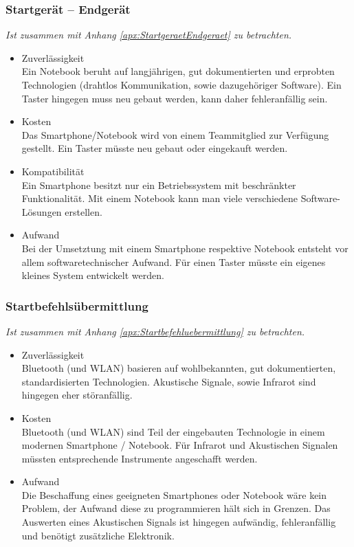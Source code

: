 		\subsubsection{Startgerät – Endgerät}
			\textit{Ist zusammen mit Anhang \ref{apx:StartgeraetEndgeraet} zu betrachten.}
			\begin{itemize}
				\item Zuverlässigkeit\\
				Ein Notebook beruht auf langjährigen, gut dokumentierten und erprobten Technologien (drahtlos Kommunikation, sowie dazugehöriger Software). Ein Taster hingegen muss neu gebaut werden, kann daher fehleranfällig sein.
				\item Kosten\\
				Das Smartphone/Notebook wird von einem Teammitglied zur Verfügung gestellt. Ein Taster müsste neu gebaut oder eingekauft werden.
				\item Kompatibilität\\
				Ein Smartphone besitzt nur ein Betriebssystem mit beschränkter Funktionalität. Mit einem Notebook kann man viele verschiedene Software-Lösungen erstellen.
				\item Aufwand\\
				Bei der Umsetztung mit einem Smartphone respektive Notebook entsteht vor allem softwaretechnischer Aufwand. Für einen Taster müsste ein eigenes kleines System entwickelt werden.
			\end{itemize}
			
		\subsubsection{Startbefehlsübermittlung}
			\textit{Ist zusammen mit Anhang \ref{apx:Startbefehluebermittlung} zu betrachten.}
			\begin{itemize}
				\item Zuverlässigkeit\\
				Bluetooth (und WLAN) basieren auf wohlbekannten, gut dokumentierten, standardisierten Technologien. Akustische Signale, sowie Infrarot sind hingegen eher störanfällig.
				\item Kosten\\
				Bluetooth (und WLAN) sind Teil der eingebauten Technologie in einem modernen Smartphone / Notebook. Für Infrarot und Akustischen Signalen müssten entsprechende Instrumente angeschafft werden.
				\item Aufwand\\
				Die Beschaffung eines geeigneten Smartphones oder Notebook wäre kein Problem, der Aufwand diese zu programmieren hält sich in Grenzen. Das Auswerten eines Akustischen Signals ist hingegen aufwändig, fehleranfällig und benötigt zusätzliche Elektronik.
			\end{itemize}	
			
